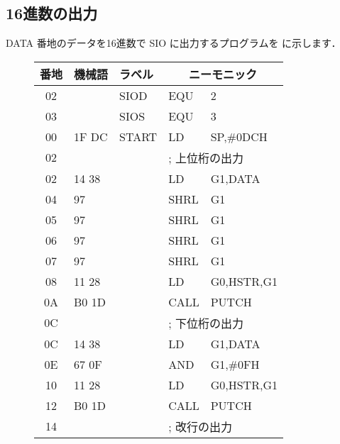 \subsection{16進数の出力}

DATA 番地のデータを16進数で SIO に出力するプログラムを
に示します．

\begin{figure}[btp]
{\small\tt\begin{center}
\begin{tabular}{|c|l|l|l l |} \hline
番地 & 機械語 & ラベル & \multicolumn{2}{|c|}{ニーモニック} \\
\hline
02 &               & SIOD   & EQU    & 2                   \\
03 &               & SIOS   & EQU    & 3                   \\
00 & 1F DC         & START  & LD     & SP,\#0DCH           \\
02 &               &        & \multicolumn{2}{l|}{; 上位桁の出力} \\
02 & 14 38         &        & LD     & G1,DATA             \\
04 & 97            &        & SHRL   & G1                  \\
05 & 97            &        & SHRL   & G1                  \\
06 & 97            &        & SHRL   & G1                  \\
07 & 97            &        & SHRL   & G1                  \\
08 & 11 28         &        & LD     & G0,HSTR,G1          \\
0A & B0 1D         &        & CALL   & PUTCH               \\
0C &               &        & \multicolumn{2}{l|}{; 下位桁の出力} \\
0C & 14 38         &        & LD     & G1,DATA             \\
0E & 67 0F         &        & AND    & G1,\#0FH            \\
10 & 11 28         &        & LD     & G0,HSTR,G1          \\
12 & B0 1D         &        & CALL   & PUTCH               \\
14 &               &        & \multicolumn{2}{l|}{; 改行の出力} \\

\end{tabular}
\end{center}}
\end{figure}
